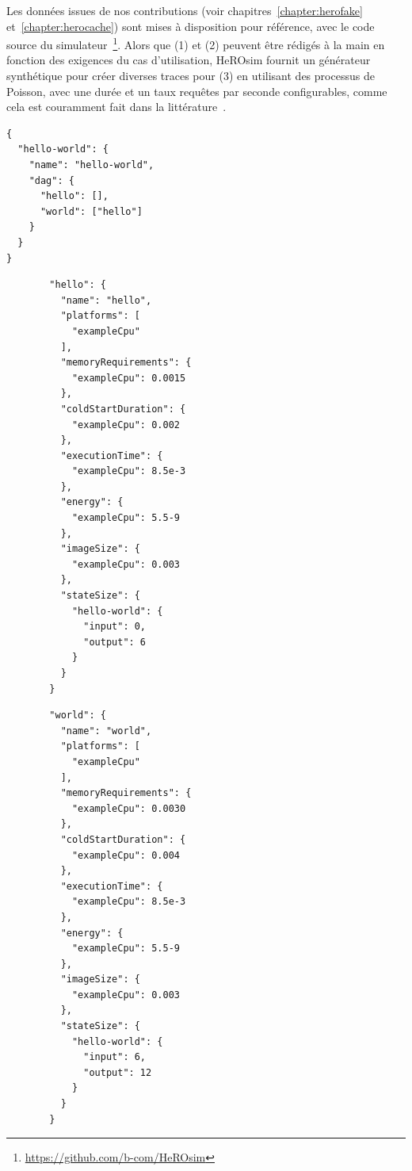 Les données issues de nos contributions (voir chapitres~\ref{chapter:herofake} et~\ref{chapter:herocache}) sont mises à disposition pour référence, avec le code source du simulateur~\footnote{\href{https://github.com/b-com/HeROsim}{https://github.com/b-com/HeROsim}}. Alors que (1) et (2) peuvent être rédigés à la main en fonction des exigences du cas d'utilisation, HeROsim fournit un générateur synthétique pour créer diverses traces pour (3) en utilisant des processus de Poisson, avec une durée et un taux requêtes par seconde configurables, comme cela est couramment fait dans la littérature~\cite{9928755}.

\begin{longlisting}
    \label{code:herosim-json-application}
    \begin{verbatim}
{
  "hello-world": {
    "name": "hello-world",
    "dag": {
      "hello": [],
      "world": ["hello"]
    }
  }
}
    \end{verbatim}
\end{longlisting}

\begin{figure}[!ht]
    \label{code:herosim-json-functions}
    \begin{minipage}{0.49\textwidth}
        \centering
        \begin{verbatim}
  "hello": {
    "name": "hello",
    "platforms": [
      "exampleCpu"
    ],
    "memoryRequirements": {
      "exampleCpu": 0.0015
    },
    "coldStartDuration": {
      "exampleCpu": 0.002
    },
    "executionTime": {
      "exampleCpu": 8.5e-3
    },
    "energy": {
      "exampleCpu": 5.5-9
    },
    "imageSize": {
      "exampleCpu": 0.003
    },
    "stateSize": {
      "hello-world": {
        "input": 0,
        "output": 6
      }
    }
  }
        \end{verbatim}
    \end{minipage}
    \begin{minipage}{0.49\textwidth}
        \centering
        \begin{verbatim}
  "world": {
    "name": "world",
    "platforms": [
      "exampleCpu"
    ],
    "memoryRequirements": {
      "exampleCpu": 0.0030
    },
    "coldStartDuration": {
      "exampleCpu": 0.004
    },
    "executionTime": {
      "exampleCpu": 8.5e-3
    },
    "energy": {
      "exampleCpu": 5.5-9
    },
    "imageSize": {
      "exampleCpu": 0.003
    },
    "stateSize": {
      "hello-world": {
        "input": 6,
        "output": 12
      }
    }
  }
        \end{verbatim}
    \end{minipage}
\end{figure}

